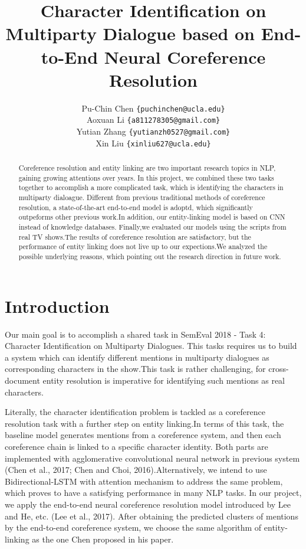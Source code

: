 \documentclass[11pt]{article}
\title{Character Identification on Multiparty Dialogue based on End-to-End Neural Coreference Resolution}
\author
{
   Pu-Chin Chen
  {\tt \{puchinchen@ucla.edu\}} \\
  Aoxuan Li 
  {\tt \{a811278305@gmail.com\}} \\
  Yutian Zhang
  {\tt \{yutianzh0527@gmail.com\}} \\
  Xin Liu
  {\tt \{xinliu627@ucla.edu\}} \\
}
\date{}
\begin{document}
\maketitle
\begin{abstract}
  Coreference resolution and entity linking are two important research topics in NLP, gaining growing attentions over years. In this project, we combined these two tasks together to accomplish a more complicated task, which is identifying the characters in multiparty dialoague. Different from previous traditional methods of coreference resolution, a state-of-the-art end-to-end model is adoptd, which significantly outpeforms other previous work.In addition, our entity-linking model is based on CNN instead of knowledge databases. Finally,we evaluated our models using the scripts from real TV shows.The results of coreference resolution are satisfactory, but the performance of entity linking does not live up to our expections.We analyzed the possible underlying reasons, which pointing out the research direction in future work.
\end{abstract}

\section{Introduction}

Our main goal is to accomplish a shared task in SemEval 2018 - Task 4: Character Identification on Multiparty Dialogues. This tasks requires us to build a system which can identify different mentions in multiparty dialogues as corresponding characters in the show.This task is rather challenging, for cross-document entity resolution is imperative for identifying such mentions as real characters.

Literally, the character identification problem is tackled as a coreference resolution task with a further step on entity linking.In terms of this task, the baseline model generates mentions from a coreference system, and then each coreference chain is linked to a specific character identity. Both parts are implemented with agglomerative convolutional neural network in previous system (Chen et al., 2017; Chen and Choi, 2016).Alternatively, we intend to use Bidirectional-LSTM with attention mechanism to address the same problem, which proves to have a satisfying performance in many NLP tasks. In our project, we apply the end-to-end neural coreference resolution model introduced by Lee and He, etc. (Lee et al., 2017). After obtaining the predicted clusters of mentions by the end-to-end coreference system, we choose the same algorithm of entity-linking as the one Chen proposed in his paper.
\end{document}
